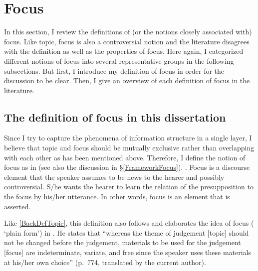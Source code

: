 

\section{Focus}\label{BackSecFocus}

In this section, I review the definitions of (or the notions closely associated with) focus.
Like topic, focus is also a controversial notion and the literature disagrees with the definition as well as the properties of focus.
Here again, I categorized different notions of focus into several representative groups in the following subsections.
But first, I introduce my definition of focus in order for the discussion to be clear.
Then, I give an overview of each definition of focus in the literature.

\subsection{The definition of focus in this dissertation}\label{BackSubsecDefFocus}

Since I try to capture the phenomena of information structure in a single layer,
I believe that topic and focus should be mutually exclusive rather than overlapping with each other
as has been mentioned above.
Therefore, I define the notion of focus as in \Next
(see also the discussion in \S \ref{FrameworkFocus}).
%
\ex. Focus is a discourse element that the speaker assumes to be news to the hearer and possibly controversial.
S/he wants the hearer to learn the relation of the presupposition to the focus by his/her utterance.
In other words, focus is an element that is asserted.
\label{BackFocDef}

Like \ref{BackDefTopic},
this definition also follows and elaborates the idea of focus ( `plain form') in .
He states that ``whereas the theme of judgement [topic] should not be changed before the judgement, materials to be used for the judgement [focus] are indeterminate, variate, and free since the speaker uses these materials at his/her own choice'' (p.~774, translated by the current author).

